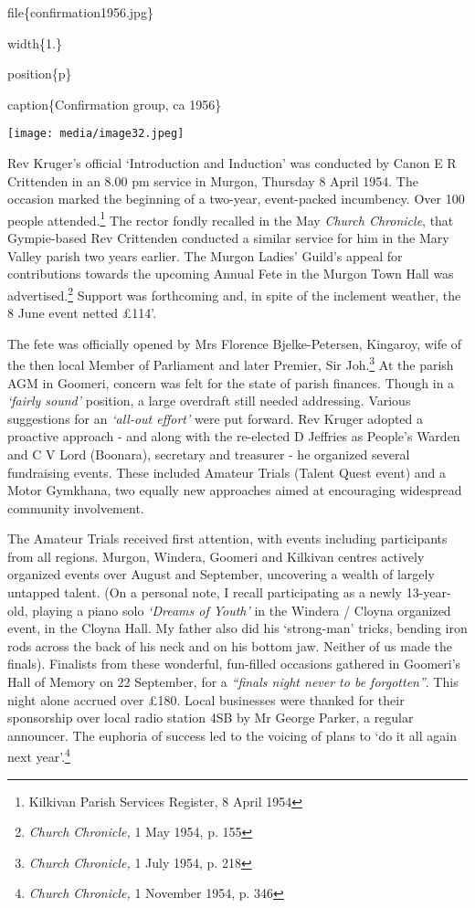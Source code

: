 file\{confirmation1956.jpg\}

width\{1.\}

position\{p\}

caption\{Confirmation group, ca 1956\}

\texttt{[image: media/image32.jpeg]}

Rev Kruger's official `Introduction and Induction' was conducted by Canon E R Crittenden in an 8.00 pm service in Murgon, Thursday 8 April 1954. The occasion marked the beginning of a two-year, event-packed incumbency. Over 100 people attended.\footnote{Kilkivan Parish Services Register, 8 April 1954} The rector fondly recalled in the May \emph{Church Chronicle}, that Gympie-based Rev Crittenden conducted a similar service for him in the Mary Valley parish two years earlier. The Murgon Ladies' Guild's appeal for contributions towards the upcoming Annual Fete in the Murgon Town Hall was advertised.\footnote{\emph{Church Chronicle,} 1 May 1954, p. 155} Support was forthcoming and, in spite of the inclement weather, the 8 June event netted £114'.

The fete was officially opened by Mrs Florence Bjelke-Petersen, Kingaroy, wife of the then local Member of Parliament and later Premier, Sir Joh.\footnote{\emph{Church Chronicle,} 1 July 1954, p. 218} At the parish AGM in Goomeri, concern was felt for the state of parish finances. Though in a \emph{`fairly sound'} position, a large overdraft still needed addressing. Various suggestions for an \emph{`all-out effort'} were put forward. Rev Kruger adopted a proactive approach - and along with the re-elected D Jeffries as People's Warden and C V Lord (Boonara), secretary and treasurer - he organized several fundraising events. These included Amateur Trials (Talent Quest event) and a Motor Gymkhana, two equally new approaches aimed at encouraging widespread community involvement.

The Amateur Trials received first attention, with events including participants from all regions. Murgon, Windera, Goomeri and Kilkivan centres actively organized events over August and September, uncovering a wealth of largely untapped talent. (On a personal note, I recall participating as a newly 13-year-old, playing a piano solo \emph{`Dreams of Youth'} in the Windera / Cloyna organized event, in the Cloyna Hall. My father also did his `strong-man' tricks, bending iron rods across the back of his neck and on his bottom jaw. Neither of us made the finals). Finalists from these wonderful, fun-filled occasions gathered in Goomeri's Hall of Memory on 22 September, for a \emph{``finals night never to be forgotten''}. This night alone accrued over £180. Local businesses were thanked for their sponsorship over local radio station 4SB by Mr George Parker, a regular announcer. The euphoria of success led to the voicing of plans to `do it all again next year'.\footnote{\emph{Church Chronicle,} 1 November 1954, p. 346}

